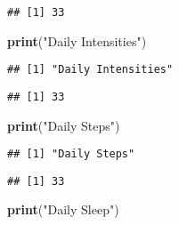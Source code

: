 \documentclass[
]{article}
\newenvironment{Shaded}{\begin{snugshade}}{\end{snugshade}}
\newcommand{\FunctionTok}[1]{\textcolor[rgb]{0.13,0.29,0.53}{\textbf{#1}}}
\newcommand{\NormalTok}[1]{#1}
\newcommand{\SpecialCharTok}[1]{\textcolor[rgb]{0.81,0.36,0.00}{\textbf{#1}}}
\newcommand{\StringTok}[1]{\textcolor[rgb]{0.31,0.60,0.02}{#1}}
\begin{document}
\begin{verbatim}
## [1] 33
\end{verbatim}

\begin{Shaded}
\begin{Highlighting}[]
\FunctionTok{print}\NormalTok{(}\StringTok{"Daily Intensities"}\NormalTok{)}
\end{Highlighting}
\end{Shaded}

\begin{verbatim}
## [1] "Daily Intensities"
\end{verbatim}

\begin{Shaded}
\end{Shaded}

\begin{verbatim}
## [1] 33
\end{verbatim}

\begin{Shaded}
\begin{Highlighting}[]
\FunctionTok{print}\NormalTok{(}\StringTok{"Daily Steps"}\NormalTok{)}
\end{Highlighting}
\end{Shaded}

\begin{verbatim}
## [1] "Daily Steps"
\end{verbatim}

\begin{Shaded}
\end{Shaded}

\begin{verbatim}
## [1] 33
\end{verbatim}

\begin{Shaded}
\begin{Highlighting}[]
\FunctionTok{print}\NormalTok{(}\StringTok{"Daily Sleep"}\NormalTok{)}
\end{Highlighting}
\end{Shaded}
\end{document}
